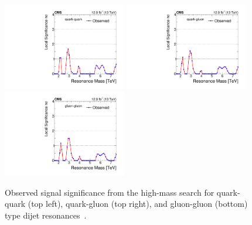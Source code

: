 \begin{figure}[hbtp]
  \centering
    \includegraphics[width=0.48\textwidth]{figs/dijet/signif_qq_pfdijet2016.pdf}
    \includegraphics[width=0.48\textwidth]{figs/dijet/signif_qg_pfdijet2016.pdf}
    \includegraphics[width=0.48\textwidth]{figs/dijet/signif_gg_pfdijet2016.pdf}
    \caption{Observed signal significance from the high-mass search for
      quark-quark (top left), quark-gluon (top right), and gluon-gluon
      (bottom) type dijet resonances~\cite{jmgd}.}
    \label{figSignifHigh}
\end{figure}

